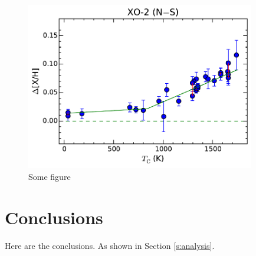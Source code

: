 \documentclass[12pt]{article}
\begin{document}
\begin{figure}
\centering
\includegraphics[width=10cm]{xo-2.pdf}
\caption{Some figure}
\end{figure}

\section{Conclusions}

Here are the conclusions. As shown in Section \ref{s:analysis}.
\end{document}
